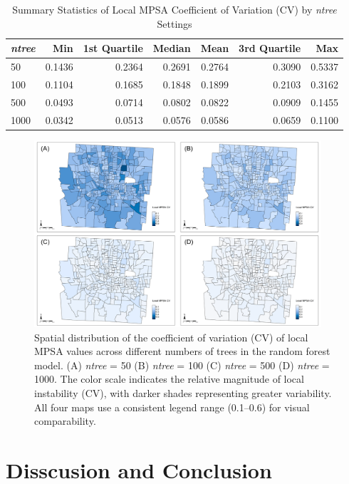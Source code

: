 \documentclass[
  a4paper,
  12pt]{article}
\begin{document}
\begin{table}[htb]
\centering
\caption{Summary Statistics of Local MPSA Coefficient of Variation (CV) by \textit{ntree} Settings}
\label{tab:local_mpsa_cv_summary}
\begin{tabular}{lrrrrrr}
\toprule
\textit{ntree} & Min   & 1st Quartile & Median & Mean  & 3rd Quartile & Max   \\
\midrule
50   & 0.1436 & 0.2364 & 0.2691 & 0.2764 & 0.3090 & 0.5337 \\
100  & 0.1104 & 0.1685 & 0.1848 & 0.1899 & 0.2103 & 0.3162 \\
500  & 0.0493 & 0.0714 & 0.0802 & 0.0822 & 0.0909 & 0.1455 \\
1000 & 0.0342 & 0.0513 & 0.0576 & 0.0586 & 0.0659 & 0.1100 \\
\bottomrule
\end{tabular}
\end{table}
\begin{figure}[htb]
\centering
\includegraphics[width=0.95\textwidth]{output/robustness/local_mpsa_cv.png}
\caption{\small Spatial distribution of the coefficient of variation (CV) of local MPSA values across different numbers of trees in the random forest model.
(A) \textit{ntree} = 50 (B) \textit{ntree} = 100 (C) \textit{ntree} = 500 (D) \textit{ntree} = 1000.
The color scale indicates the relative magnitude of local instability (CV), with darker shades representing greater variability.
All four maps use a consistent legend range (0.1–0.6) for visual comparability.}
\label{fig:local_mpsa_cv}
\end{figure}

\section{Disscusion and Conclusion}\label{disscusion-and-conclusion}
\end{document}
